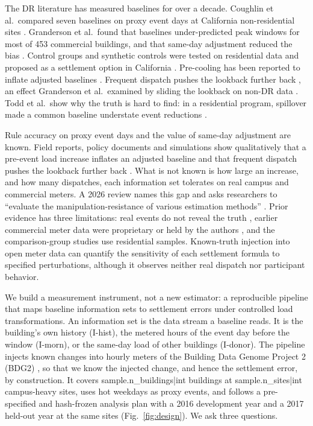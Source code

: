 The DR literature has measured baselines for over a decade. Coughlin et al.\ compared seven baselines on proxy event days at California non-residential sites \citep{coughlin2009}. Granderson et al.\ found that baselines under-predicted peak windows for most of 453 commercial buildings, and that same-day adjustment reduced the bias \citep{granderson2021}. Control groups and synthetic controls were tested on residential data \citep{hatton2016,wang2018spm,lee2019,sievers2026} and proposed as a settlement option in California \citep{caiso_bawg2017}. Pre-cooling has been reported to inflate adjusted baselines \citep{coughlin2009,braithwait2010,li2026review}. Frequent dispatch pushes the lookback further back \citep{enernoc2009naesb,dsa2023elrp}, an effect Granderson et al.\ examined by sliding the lookback on non-DR data \citep{granderson2023}. Todd et al.\ show why the truth is hard to find: in a residential program, spillover made a common baseline understate event reductions \citep{todd2019}.

Rule accuracy on proxy event days and the value of same-day adjustment are known. Field reports, policy documents and simulations show qualitatively that a pre-event load increase inflates an adjusted baseline and that frequent dispatch pushes the lookback further back \citep{gabaldon2021,afentoulis2025,wang2022manipulation,wang2026physics}. What is not known is how large an increase, and how many dispatches, each information set tolerates on real campus and commercial meters. A 2026 review names this gap and asks researchers to ``evaluate the manipulation-resistance of various estimation methods'' \citep{li2026review}. Prior evidence has three limitations: real events do not reveal the truth \citep{todd2019}, earlier commercial meter data were proprietary or held by the authors \citep{granderson2021,mathieu2011cdc}, and the comparison-group studies use residential samples. Known-truth injection into open meter data can quantify the sensitivity of each settlement formula to specified perturbations, although it observes neither real dispatch nor participant behavior.

We build a measurement instrument, not a new estimator: a reproducible pipeline that maps baseline information sets to settlement errors under controlled load transformations. An information set is the data stream a baseline reads. It is the building's own history (I-hist), the metered hours of the event day before the window (I-morn), or the same-day load of other buildings (I-donor). The pipeline injects known changes into hourly meters of the Building Data Genome Project 2 (BDG2) \citep{miller2020bdg2}, so that we know the injected change, and hence the settlement error, by construction. It covers {{sample.n_buildings|int}} buildings at {{sample.n_sites|int}} campus-heavy sites, uses hot weekdays as proxy events, and follows a pre-specified and hash-frozen analysis plan with a 2016 development year and a 2017 held-out year at the same sites (Fig.~\ref{fig:design}). We ask three questions.

